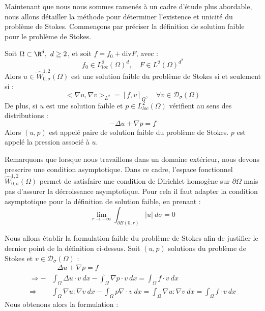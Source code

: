\vspace{1em}
Maintenant que nous nous sommes ramenés à un cadre d'étude plus abordable, nous allons détailler la méthode pour déterminer l'existence et unicité du problème de Stokes.
Commençons par préciser la définition de solution faible pour le problème de Stokes.
\begin{definitionbox}
    \begin{definition}
        Soit $\Omega \subset \R^d, \ d \geq 2$, et soit $f = f_0 + \text{div}F$, avec :
        $$ f_0 \in L^2_{loc}(\Omega)^d, \quad F \in L^2(\Omega)^{d^2} $$
        Alors $u \in \widehat{W}_{0,\sigma}^{1,2}(\Omega)$ est une solution faible du problème de Stokes si et seulement si :
        $$ \big< \nabla u,\nabla v \big>_{L^2} = [f,v]_{\Omega}, \quad \forall v \in \mathcal{D}_{\sigma}(\Omega) $$
        De plus, si $u$ est une solution faible et $p \in L^2_{loc}(\Omega)$ vérifient au sens des distributions :
        $$ - \Delta u + \nabla p = f $$
        Alors $(u,p)$ est appelé paire de solution faible du problème de Stokes. $p$ est appelé la pression associé à $u$.
    \end{definition}
\end{definitionbox}
\begin{remarkbox}
    Remarquons que lorsque nous travaillons dans un domaine extérieur, nous devons prescrire une condition asymptotique. Dans ce cadre, l'espace fonctionnel $\widehat{W}_{0,\sigma}^{1,2}(\Omega)$ permet de satisfaire une condition 
    de Dirichlet homogène sur $\partial \Omega$ mais pas d'assurer la décroissance asymptotique. Pour cela il faut adapter la condition asymptotique pour la définition de solution faible, en prenant :
    $$ \underset{r \to +\infty}{\lim} \int_{\partial B(0,r)} |u| \ d\sigma = 0$$
\end{remarkbox}
Nous allons établir la formulation faible du problème de Stokes afin de justifier le dernier point de la définition ci-dessus. Soit $(u,p)$ solutions du problème de Stokes et $v \in \mathcal{D}_{\sigma}(\Omega)$ :
\begin{align*}
    &-\Delta u + \nabla p = f \\
    \Rightarrow -&\int_{\Omega} \Delta u \cdot v \ dx - \int_{\Omega} \nabla p \cdot v \ dx = \int_{\Omega} f \cdot v \ dx \\
    \Rightarrow &\int_{\Omega} \nabla u : \nabla v \ dx - \int_{\Omega} p \nabla \cdot v \ dx = \int_{\Omega} \nabla u : \nabla v \ dx = \int_{\Omega} f\cdot v \ dx
\end{align*}
Nous obtenons alors la formulation :
